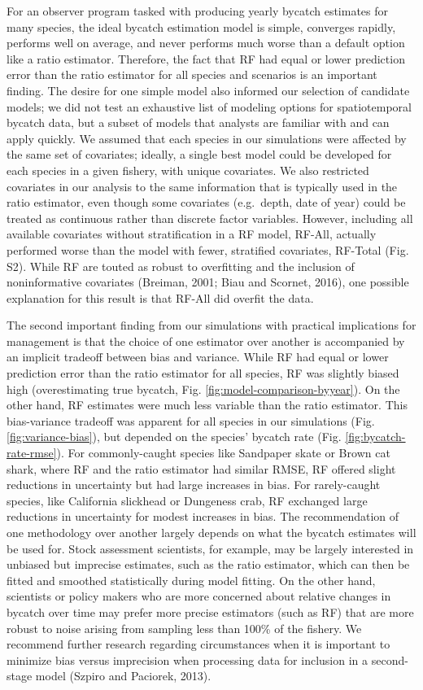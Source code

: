 \documentclass[]{article}
\begin{document}
For an observer program tasked with producing yearly bycatch estimates
for many species, the ideal bycatch estimation model is simple,
converges rapidly, performs well on average, and never performs much
worse than a default option like a ratio estimator. Therefore, the fact
that RF had equal or lower prediction error than the ratio estimator for
all species and scenarios is an important finding. The desire for one
simple model also informed our selection of candidate models; we did not
test an exhaustive list of modeling options for spatiotemporal bycatch
data, but a subset of models that analysts are familiar with and can
apply quickly. We assumed that each species in our simulations were
affected by the same set of covariates; ideally, a single best model
could be developed for each species in a given fishery, with unique
covariates. We also restricted covariates in our analysis to the same
information that is typically used in the ratio estimator, even though
some covariates (e.g.~depth, date of year) could be treated as
continuous rather than discrete factor variables. However, including all
available covariates without stratification in a RF model, RF-All,
actually performed worse than the model with fewer, stratified
covariates, RF-Total (Fig. S2). While RF are touted as robust to
overfitting and the inclusion of noninformative covariates (Breiman,
2001; Biau and Scornet, 2016), one possible explanation for this result
is that RF-All did overfit the data.

The second important finding from our simulations with practical
implications for management is that the choice of one estimator over
another is accompanied by an implicit tradeoff between bias and
variance. While RF had equal or lower prediction error than the ratio
estimator for all species, RF was slightly biased high (overestimating
true bycatch, Fig. \ref{fig:model-comparison-byyear}). On the other
hand, RF estimates were much less variable than the ratio estimator.
This bias-variance tradeoff was apparent for all species in our
simulations (Fig. \ref{fig:variance-bias}), but depended on the species'
bycatch rate (Fig. \ref{fig:bycatch-rate-rmse}). For commonly-caught
species like Sandpaper skate or Brown cat shark, where RF and the ratio
estimator had similar RMSE, RF offered slight reductions in uncertainty
but had large increases in bias. For rarely-caught species, like
California slickhead or Dungeness crab, RF exchanged large reductions in
uncertainty for modest increases in bias. The recommendation of one
methodology over another largely depends on what the bycatch estimates
will be used for. Stock assessment scientists, for example, may be
largely interested in unbiased but imprecise estimates, such as the
ratio estimator, which can then be fitted and smoothed statistically
during model fitting. On the other hand, scientists or policy makers who
are more concerned about relative changes in bycatch over time may
prefer more precise estimators (such as RF) that are more robust to
noise arising from sampling less than 100\% of the fishery. We recommend
further research regarding circumstances when it is important to
minimize bias versus imprecision when processing data for inclusion in a
second-stage model (Szpiro and Paciorek, 2013).
\end{document}
